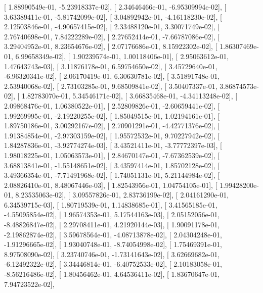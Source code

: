 \documentclass{article}
\begin{document}
       [  1.88990549e-01,  -5.23918337e-02],
       [  2.34646466e-01,  -6.95309994e-02],
       [  3.63389411e-01,  -5.81742099e-02],
       [  3.04892942e-01,  -4.16118230e-02],
       [  2.12503846e-01,  -4.90657415e-02],
       [  2.33488120e-01,   3.30071749e-02],
       [  2.76740698e-01,   7.84222289e-02],
       [  2.27652414e-01,  -7.66787086e-02],
       [  3.29404952e-01,   8.23654676e-02],
       [  2.07176686e-01,   8.15922302e-02],
       [  1.86307469e-01,   6.99658349e-02],
       [  1.90239574e-01,   1.00118406e-01],
       [  2.95063612e-01,   1.47643743e-03],
       [  3.11876178e-01,   6.59754650e-02],
       [  3.45729640e-01,  -6.96320341e-02],
       [  2.06170419e-01,   6.30630781e-02],
       [  3.51891748e-01,   2.53940068e-02],
       [  2.73103285e-01,   9.68509841e-02],
       [  3.50407337e-01,   3.86874573e-02],
       [  1.82783070e-01,   5.34546171e-02],
       [  3.66835468e-01,  -4.34113248e-02],
       [  2.09868476e-01,   1.06380522e-01],
       [  2.52809826e-01,  -2.60659441e-02],
       [  1.99269995e-01,  -2.19220255e-02],
       [  1.85049515e-01,   1.02194161e-01],
       [  1.89750186e-01,   3.00292167e-02],
       [  2.70901291e-01,  -4.42771376e-02],
       [  1.91384854e-01,  -2.97303159e-02],
       [  1.95572532e-01,   9.70227942e-02],
       [  1.84287836e-01,  -3.92774274e-03],
       [  3.43521411e-01,  -3.77772397e-03],
       [  1.98018225e-01,   1.05063573e-01],
       [  2.84670147e-01,  -7.67362539e-02],
       [  3.68813841e-01,  -1.55148651e-02],
       [  3.43597414e-01,   1.85702128e-02],
       [  3.49366354e-01,  -7.71491968e-02],
       [  1.74051131e-01,   5.21144984e-02],
       [  2.08826410e-01,   8.48067446e-03],
       [  1.82543956e-01,   1.04754105e-01],
       [  1.99428200e-01,   8.23535063e-02],
       [  3.09557826e-01,   2.83736199e-02],
       [  2.04161290e-01,   6.34539715e-03],
       [  1.80719539e-01,   1.14838685e-01],
       [  3.41565185e-01,  -4.55095854e-02],
       [  1.96574353e-01,   5.17544163e-03],
       [  2.05152056e-01,  -8.48826847e-02],
       [  2.29708411e-01,   4.21920144e-03],
       [  1.90091178e-01,  -2.19862874e-02],
       [  3.59678564e-01,  -4.08713878e-02],
       [  2.04304248e-01,  -1.91296665e-02],
       [  1.93040748e-01,  -8.74054998e-02],
       [  1.75469391e-01,   8.97508090e-02],
       [  3.23740746e-01,  -1.73141643e-02],
       [  3.62669682e-01,  -6.12492322e-02],
       [  3.34446814e-01,  -6.40752533e-02],
       [  2.10183058e-01,  -8.56216486e-02],
       [  1.80456462e-01,   4.64536411e-02],
       [  1.83670647e-01,   7.94723522e-02],
\end{document}
